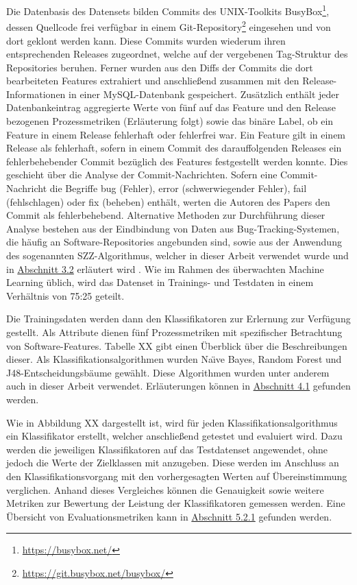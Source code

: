 Die Datenbasis des Datensets bilden Commits des UNIX-Toolkits BusyBox\footnote{\url{https://busybox.net/}}, dessen Quellcode frei verfügbar in einem Git-Repository\footnote{\url{https://git.busybox.net/busybox/}} eingesehen und von dort geklont werden kann. Diese Commits wurden wiederum ihren entsprechenden Releases zugeordnet, welche auf der vergebenen Tag-Struktur des Repositories beruhen. Ferner wurden aus den Diffs der Commits die dort bearbeiteten Features extrahiert und anschließend zusammen mit den Release-Informationen in einer MySQL-Datenbank gespeichert. Zusätzlich enthält jeder Datenbankeintrag aggregierte Werte von fünf auf das Feature und den Release bezogenen Prozessmetriken (Erläuterung folgt) sowie das binäre Label, ob ein Feature in einem Release fehlerhaft oder fehlerfrei war. Ein Feature gilt in einem Release als fehlerhaft, sofern in einem Commit des darauffolgenden Releases ein fehlerbehebender Commit bezüglich des Features festgestellt werden konnte. Dies geschieht über die Analyse der Commit-Nachrichten. Sofern eine Commit-Nachricht die Begriffe \glqq bug\grqq{} (Fehler), \glqq error\grqq{} (schwerwiegender Fehler), \glqq fail\grqq{} (fehlschlagen) oder \glqq fix\grqq{} (beheben) enthält, werten die Autoren des Papers den Commit als fehlerbehebend. Alternative Methoden zur Durchführung dieser Analyse bestehen aus der Eindbindung von Daten aus Bug-Tracking-Systemen, die häufig an Software-Repositories angebunden sind, sowie aus der Anwendung des sogenannten SZZ-Algorithmus, welcher in dieser Arbeit verwendet wurde und in \hyperref[szz-def]{Abschnitt 3.2} erläutert wird \cite{Sliwerski2005,Zimmermann2007}. Wie im Rahmen des überwachten Machine Learning üblich, wird das Datenset in Trainings- und Testdaten in einem Verhältnis von 75:25 geteilt. 

Die Trainingsdaten werden dann den Klassifikatoren zur Erlernung zur Verfügung gestellt. Als Attribute dienen fünf Prozessmetriken mit spezifischer Betrachtung von Software-Features. Tabelle XX gibt einen Überblick über die Beschreibungen dieser. Als Klassifikationsalgorithmen wurden Na\"{\i}ve Bayes, Random Forest und J48-Entscheidungsbäume gewählt. Diese Algorithmen wurden unter anderem auch in dieser Arbeit verwendet. Erläuterungen können in \hyperref[algorithms]{Abschnitt 4.1} gefunden werden.

Wie in Abbildung XX dargestellt ist, wird für jeden Klassifikationsalgorithmus ein Klassifikator erstellt, welcher anschließend getestet und evaluiert wird. Dazu werden die jeweiligen Klassifikatoren auf das Testdatenset angewendet, ohne jedoch die Werte der Zielklassen mit anzugeben. Diese werden im Anschluss an den Klassifikationsvorgang mit den vorhergesagten Werten auf Übereinstimmung verglichen. Anhand dieses Vergleiches können die Genauigkeit sowie weitere Metriken zur Bewertung der Leistung der Klassifikatoren gemessen werden. Eine Übersicht von Evaluationsmetriken kann in \hyperref[eval-metrics]{Abschnitt 5.2.1} gefunden werden.

